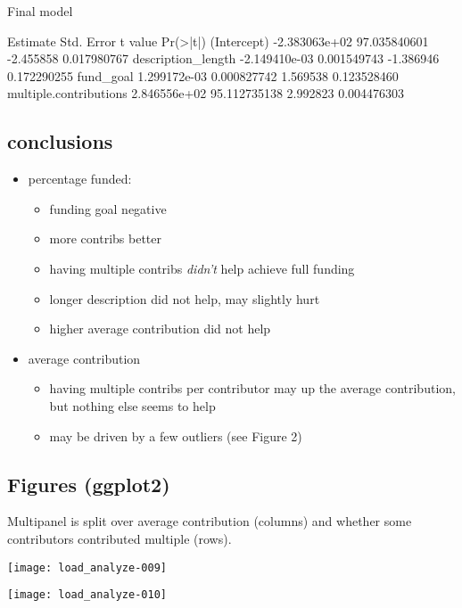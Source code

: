 \documentclass[11pt, reqno]{amsart}
\numberwithin{equation}{section}
\begin{document}
Final model
\begin{Schunk}
\begin{Soutput}
                            Estimate   Std. Error   t value    Pr(>|t|)
(Intercept)            -2.383063e+02 97.035840601 -2.455858 0.017980767
description_length     -2.149410e-03  0.001549743 -1.386946 0.172290255
fund_goal               1.299172e-03  0.000827742  1.569538 0.123528460
multiple.contributions  2.846556e+02 95.112735138  2.992823 0.004476303
\end{Soutput}
\end{Schunk}


\subsection*{conclusions}
\begin{itemize}
  \item  percentage funded: 
    \begin{itemize}
      \item funding goal negative
      \item  more contribs better
      \item  having multiple contribs {\em didn't} help achieve full funding
      \item longer description did not help, may slightly hurt
      \item higher average contribution did not help
      \end{itemize}
    \item average contribution 
      \begin{itemize}
      \item having multiple contribs per contributor may up the average contribution, but nothing else seems to help
      \item  may be driven by a few outliers (see Figure 2)
      \end{itemize}
      \end{itemize}

      \newpage
\subsection*{Figures (ggplot2)}
Multipanel is split over average contribution (columns) and whether some contributors contributed multiple (rows).

\texttt{[image: load\_analyze-009]}

\texttt{[image: load\_analyze-010]}
\end{document}
